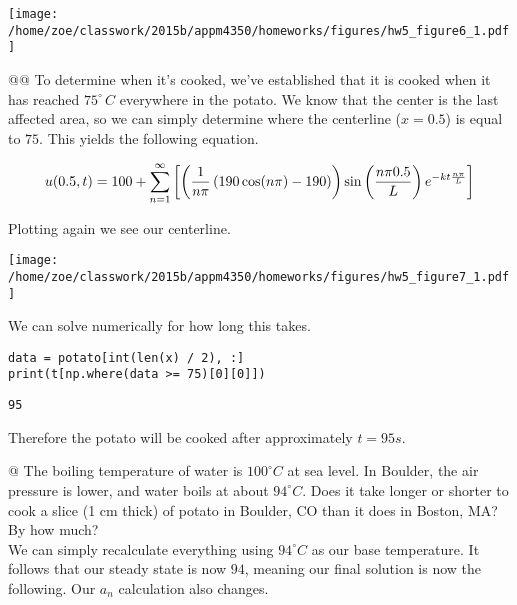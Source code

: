 \documentclass[10pt]{article}
\begin{document}
\begin{easylist}[enumerate]
\simpleweave

\texttt{[image: /home/zoe/classwork/2015b/appm4350/homeworks/figures/hw5\_figure6\_1.pdf]}

\nosimpleweave

    @@ To determine when it's cooked, we've established that it is cooked when it has reached $75^\circ \, C$
    everywhere in the potato. We know that the center is the last affected area, so we can simply determine where the
    centerline ($x = 0.5$) is equal to $75$. This yields the following equation.

    \begin{align*}
        u(0.5, t) = 100 + \sum_{n=1}^\infty \left[ \left( \frac{1}{n\pi} \left( 190 \cos(n\pi) - 190 \right) \right) \sin\left(\frac{n\pi 0.5}{L}\right) e^{-kt\frac{n\pi}{L}}\right] 
    \end{align*}

    Plotting again we see our centerline.

\simpleweave

\texttt{[image: /home/zoe/classwork/2015b/appm4350/homeworks/figures/hw5\_figure7\_1.pdf]}

\nosimpleweave

    We can solve numerically for how long this takes.

\weave

\begin{verbatim}
data = potato[int(len(x) / 2), :]
print(t[np.where(data >= 75)[0][0]])
\end{verbatim}
\begin{verbatim}
95

\end{verbatim}

\noweave

Therefore the potato will be cooked after approximately $t=95 s$.

    @ The boiling temperature of water is $100^\circ C$ at sea level. In Boulder, the air pressure is lower, and water
    boils at about $94^\circ C$. Does it take longer or shorter to cook a slice (1 cm thick) of potato in Boulder, CO
    than it does in Boston, MA? By how much?\\

    We can simply recalculate everything using $94^\circ C$ as our base temperature. It follows that our steady state is
    now $94$, meaning our final solution is now the following. Our $a_n$ calculation also changes.


\end{easylist}
\end{document}
